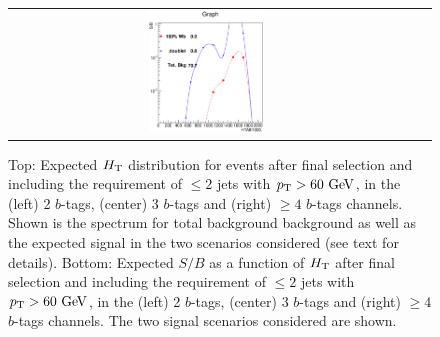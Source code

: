 \begin{figure}[h!tb]
\begin{center}
\begin{tabular}{ccc}
\includegraphics[width=0.3\textwidth]{appendices/figures/htx_httail/sb_HTAll_MUON_6jetin4btagin_Njets60lower3} \\
\end{tabular}\caption{Top: Expected $\HT$ distribution for events after final selection and including the
requirement of $\leq 2$ jets with $\pt>60\gev$, in the (left) 2 $b$-tags, (center) 3 $b$-tags and (right) $\geq 4$ $b$-tags channels.
Shown is the spectrum for total background background as well as the expected signal in the two scenarios considered
(see text for details). Bottom: Expected $S/B$ as a function of $\HT$ after final selection and including the
requirement of $\leq 2$ jets with $\pt>60\gev$, in the (left) 2 $b$-tags, (center) 3 $b$-tags and (right) $\geq 4$ $b$-tags channels.
The two signal scenarios considered are shown.\label{fig:blinding_on_Njets_HT}}

\end{center}
\end{figure}
